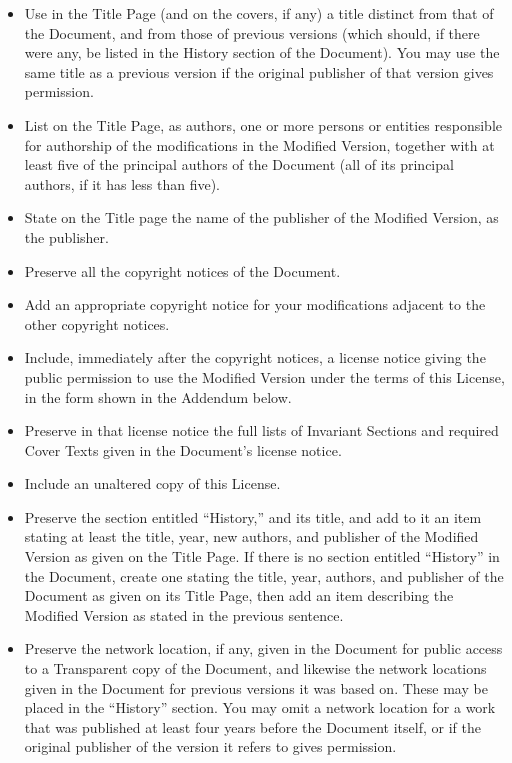 \documentclass{doc}
\begin{document}
\begin{itemize}
\item Use in the Title Page (and on the covers, if any) a title distinct
   from that of the Document, and from those of previous versions
   (which should, if there were any, be listed in the History section
   of the Document).  You may use the same title as a previous version
   if the original publisher of that version gives permission.
\item List on the Title Page, as authors, one or more persons or entities
   responsible for authorship of the modifications in the Modified
   Version, together with at least five of the principal authors of the
   Document (all of its principal authors, if it has less than five).
\item State on the Title page the name of the publisher of the
   Modified Version, as the publisher.
\item Preserve all the copyright notices of the Document.
\item Add an appropriate copyright notice for your modifications
   adjacent to the other copyright notices.
\item Include, immediately after the copyright notices, a license notice
   giving the public permission to use the Modified Version under the
   terms of this License, in the form shown in the Addendum below.
\item Preserve in that license notice the full lists of Invariant Sections
   and required Cover Texts given in the Document's license notice.
\item Include an unaltered copy of this License.
\item Preserve the section entitled ``History,'' and its title, and add to
   it an item stating at least the title, year, new authors, and
   publisher of the Modified Version as given on the Title Page.  If
   there is no section entitled ``History'' in the Document, create one
   stating the title, year, authors, and publisher of the Document as
   given on its Title Page, then add an item describing the Modified
   Version as stated in the previous sentence.
\item Preserve the network location, if any, given in the Document for
   public access to a Transparent copy of the Document, and likewise
   the network locations given in the Document for previous versions
   it was based on.  These may be placed in the ``History'' section.
   You may omit a network location for a work that was published at
   least four years before the Document itself, or if the original
   publisher of the version it refers to gives permission.

\end{itemize}
\end{document}
